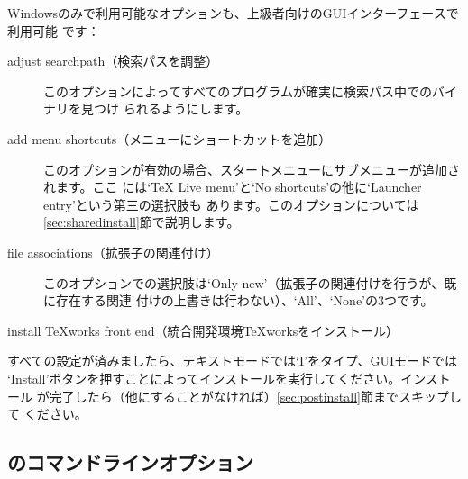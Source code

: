 \documentclass[uplatex,dvipdfmx,12pt,tombow]{jsarticle}
\begin{document}
Windowsのみで利用可能なオプションも、上級者向けのGUIインターフェースで利用可能
です：
%
\begin{description}
\item[adjust searchpath（検索パスを調整）]
このオプションによってすべてのプログラムが確実に検索パス中で\TL のバイナリを見つけ
られるようにします。

\item[add menu shortcuts（メニューにショートカットを追加）]
このオプションが有効の場合、スタートメニューに\TL サブメニューが追加されます。ここ
には`TeX Live menu'と`No shortcuts'の他に`Launcher entry'という第三の選択肢も
あります。このオプションについては\ref{sec:sharedinstall}節で説明します。

\item[file associations（拡張子の関連付け）]
このオプションでの選択肢は`Only new'（拡張子の関連付けを行うが、既に存在する関連
付けの上書きは行わない）、`All'、`None'の3つです。

\item[install \TeX works front end（統合開発環境\TeX worksをインストール）]
\end{description}

すべての設定が済みましたら、テキストモードでは`I'をタイプ、GUIモードでは
`Install'ボタンを押すことによってインストールを実行してください。インストール
が完了したら（他にすることがなければ）\ref{sec:postinstall}節までスキップして
ください。

\subsection{のコマンドラインオプション}
\label{sec:cmdline}
\end{document}

